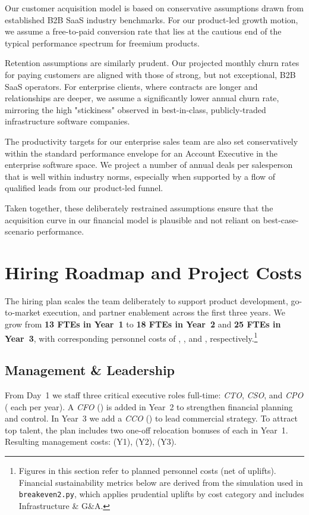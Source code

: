 \documentclass[11pt, a4paper, oneside]{article}
\begin{document}
Our customer acquisition model is based on conservative assumptions drawn from established B2B SaaS industry benchmarks. For our product-led growth motion, we assume a free-to-paid conversion rate that lies at the cautious end of the typical performance spectrum for freemium products.

Retention assumptions are similarly prudent. Our projected monthly churn rates for paying customers are aligned with those of strong, but not exceptional, B2B SaaS operators. For enterprise clients, where contracts are longer and relationships are deeper, we assume a significantly lower annual churn rate, mirroring the high "stickiness" observed in best-in-class, publicly-traded infrastructure software companies.

The productivity targets for our enterprise sales team are also set conservatively within the standard performance envelope for an Account Executive in the enterprise software space. We project a number of annual deals per salesperson that is well within industry norms, especially when supported by a flow of qualified leads from our product-led funnel.

Taken together, these deliberately restrained assumptions ensure that the acquisition curve in our financial model is plausible and not reliant on best-case-scenario performance.

\newpage
\section{Hiring Roadmap and Project Costs}
\label{sec:hiring-roadmap}

The hiring plan scales the team deliberately to support product development, go-to-market execution, and partner enablement across the first three years. We grow from \textbf{13 FTEs in Year~1} to \textbf{18 FTEs in Year~2} and \textbf{25 FTEs in Year~3}, with corresponding personnel costs of \textbf{}, \textbf{}, and \textbf{}, respectively.\footnote{Figures in this section refer to planned personnel costs (net of uplifts). Financial sustainability metrics below are derived from the simulation used in \texttt{breakeven2.py}, which applies prudential uplifts by cost category and includes Infrastructure \& G\&A.}

\subsection{Management \& Leadership}
From Day~1 we staff three critical executive roles full-time: \textit{CTO}, \textit{CSO}, and \textit{CPO} ( each per year). A \textit{CFO} () is added in Year~2 to strengthen financial planning and control. In Year~3 we add a \textit{CCO} () to lead commercial strategy. To attract top talent, the plan includes two one-off relocation bonuses of  each in Year~1. Resulting management costs: \textbf{} (Y1), \textbf{} (Y2), \textbf{} (Y3).
\end{document}
